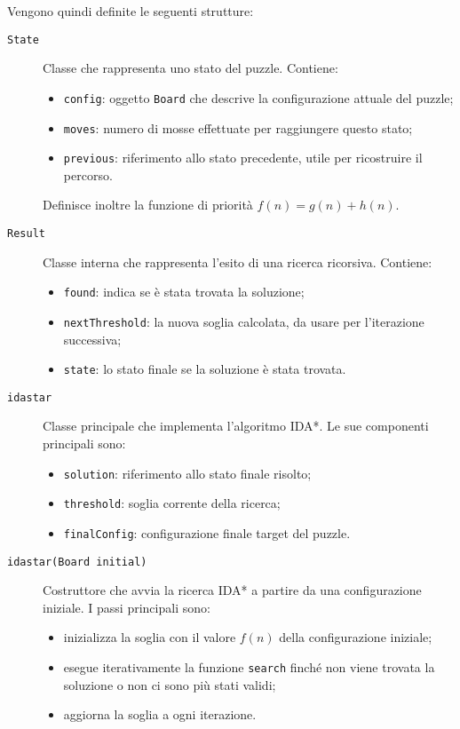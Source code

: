 Vengono quindi definite le seguenti strutture:  

\begin{description}

    \item[\texttt{State}]  
        Classe che rappresenta uno stato del puzzle. Contiene:
        \begin{itemize}
            \item \texttt{config}: oggetto \texttt{Board} che descrive la configurazione attuale del puzzle;
            \item \texttt{moves}: numero di mosse effettuate per raggiungere questo stato;
            \item \texttt{previous}: riferimento allo stato precedente, utile per ricostruire il percorso.
        \end{itemize}
        Definisce inoltre la funzione di priorità $f(n) = g(n) + h(n)$.

    \item[\texttt{Result}]  
        Classe interna che rappresenta l’esito di una ricerca ricorsiva. Contiene:
        \begin{itemize}
            \item \texttt{found}: indica se è stata trovata la soluzione;
            \item \texttt{nextThreshold}: la nuova soglia calcolata, da usare per l’iterazione successiva;
            \item \texttt{state}: lo stato finale se la soluzione è stata trovata.
        \end{itemize}

    \item[\texttt{idastar}]  
        Classe principale che implementa l’algoritmo IDA*. Le sue componenti principali sono:
        \begin{itemize}
            \item \texttt{solution}: riferimento allo stato finale risolto;
            \item \texttt{threshold}: soglia corrente della ricerca;
            \item \texttt{finalConfig}: configurazione finale target del puzzle.
        \end{itemize}

    \item[\texttt{idastar(Board initial)}]  
        Costruttore che avvia la ricerca IDA* a partire da una configurazione iniziale.  
        I passi principali sono:
        \begin{itemize}
            \item inizializza la soglia con il valore $f(n)$ della configurazione iniziale;
            \item esegue iterativamente la funzione \texttt{search} finché non viene trovata la soluzione o non ci sono più stati validi;
            \item aggiorna la soglia a ogni iterazione.
        \end{itemize}


\end{description}
